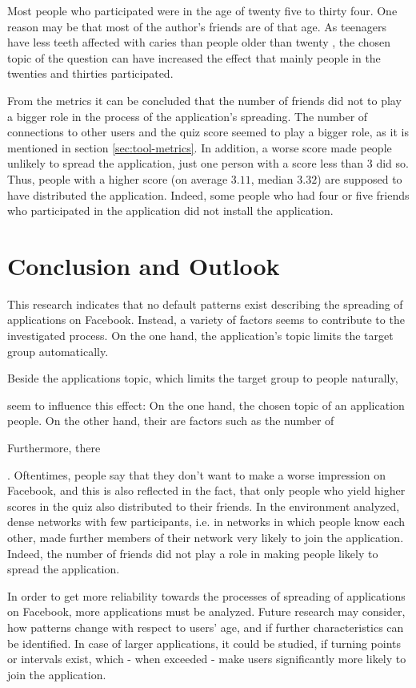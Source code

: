 \documentclass[preprint,12pt]{elsarticle}
\begin{document}
Most people who participated were in the age of twenty five to thirty
four. One reason may be that most of the author's friends are of that
age. As teenagers have less teeth affected with
caries than people older than twenty \cite{zahngesundheit}, the chosen
topic of the question can have increased the effect that mainly people
in the twenties and thirties participated.

From the metrics it can be concluded that the number of friends did
not to play a bigger role in the 
process of the application's spreading. The number of connections
to other users and the quiz score seemed to play a bigger 
role, as it is mentioned in section \ref{sec:tool-metrics}. 
In addition, a worse score made people unlikely
to spread the application, just one person with a score less than 3
did so. Thus, people with a higher score (on average $3.11$, median $3.32$) are
supposed to have distributed the application. Indeed, some people who
had four or five friends who participated in the application did not
install the application.


\section{Conclusion and Outlook}
\label{sec:conclusion}
This research indicates that no default patterns exist describing the 
spreading of applications on Facebook. Instead, a variety of
factors seems to contribute to the investigated process. On the one
hand, the application's topic limits the target group
automatically. 

Beside the 
applications topic, which limits the target group to people naturally, 


seem to influence this effect: On the one hand, the chosen topic of an
application 
people. On the other hand, their are factors such as the number of 

Furthermore, there 

. Oftentimes, people say that they don't want to
make a worse impression on Facebook, and this is also reflected in the
fact, that only people who yield higher scores in the quiz also
distributed to their friends. In the environment analyzed, dense
networks with few participants, i.e. in networks in which people know
each other, made  further members of their network very likely to join
the application. Indeed, the number of friends did not play a role in
making people likely to spread the application.


In order to get more reliability towards the processes of spreading
of applications on Facebook, more applications must be analyzed.
Future research may consider, how patterns change with respect
to users' age, and if further characteristics can be identified. In
case of larger applications, it could be studied, if turning points
or intervals exist, which - when exceeded - make users significantly
more likely to join the application.
\end{document}
